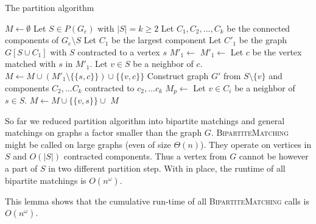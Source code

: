 \begin{algorithm}
\caption{The partition algorithm}
\label{partition_algo}
\begin{algorithmic}[1]
\State $M \gets \emptyset$
    \State Let $S\in P(G_e)$ with $|S|=k\ge2$
    \State Let $C_1,C_2,...,C_k$ be the connected components of $G_e\setminus S$
    \State Let $C_1$ be the largest component
    \State Let $C'_1$ be the graph $G[S\cup C_1]$ with $S$ contracted to a  vertex $s$
        \State $M'_1 \gets$ 
    \Else
        \State $M'_1 \gets$ 
    \EndIf
    \State Let $c$ be the vertex matched with $s$ in $M'_1$.
    \State Let $v\in S$ be a neighbor of $c$.
    \State $M \gets M \cup (M'_1 \setminus \{\{s,c\}\}) \cup \{\{v,c\}\}$
    \State Construct graph $G'$ from $S\setminus\{v\}$ and components $C_2,...C_k$ contracted to $c_2,...c_k$
    \State $M_p \gets$ 
        \State Let $v\in C_i$ be a neighbor of $s\in S$.
        \State $M \gets M \cup \{\{v,s\}\} \cup$ 
    \EndFor
\EndFor
\State \Return $M$
\EndFunction
\end{algorithmic}
\end{algorithm}

So far we reduced partition algorithm into bipartite matchings and general matchings on graphs a factor smaller than the graph $G$.
\textsc{BipartiteMatching} might be called on large graphs (even of size $\Theta(n)$). They operate on vertices in $S$ and $O(|S|)$ contracted components.
Thus a vertex from $G$ cannot be however a part of $S$ in two different partition step.
With  in place, the runtime of all bipartite matchings is $O(n^\omega)$.

This lemma shows that the cumulative run-time of all \textsc{BipartiteMatching} calls is $O(n^\omega)$.


